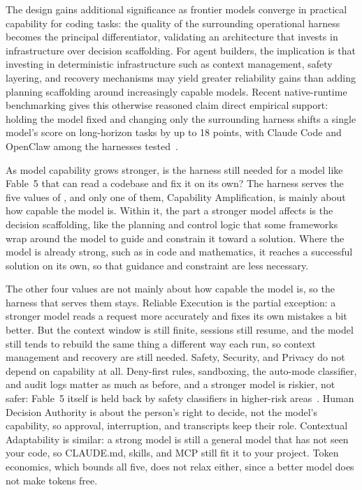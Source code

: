 The design gains additional significance as frontier models converge in practical capability for coding tasks: the quality of the surrounding operational harness becomes the principal differentiator, validating an architecture that invests in infrastructure over decision scaffolding. For agent builders, the implication is that investing in deterministic infrastructure such as context management, safety layering, and recovery mechanisms may yield greater reliability gains than adding planning scaffolding around increasingly capable models. Recent native-runtime benchmarking gives this otherwise reasoned claim direct empirical support: holding the model fixed and changing only the surrounding harness shifts a single model's score on long-horizon tasks by up to 18 points, with Claude Code and OpenClaw among the harnesses tested~\citep{ding2026wildclawbench}.

\tierC{} As model capability grows stronger, is the harness still needed for a model like Fable~5 that can read a codebase and fix it on its own? The harness serves the five values of , and only one of them, Capability Amplification, is mainly about how capable the model is. Within it, the part a stronger model affects is the decision scaffolding, like the planning and control logic that some frameworks wrap around the model to guide and constrain it toward a solution. Where the model is already strong, such as in code and mathematics, it reaches a successful solution on its own, so that guidance and constraint are less necessary.

The other four values are not mainly about how capable the model is, so the harness that serves them stays. Reliable Execution is the partial exception: a stronger model reads a request more accurately and fixes its own mistakes a bit better. But the context window is still finite, sessions still resume, and the model still tends to rebuild the same thing a different way each run, so context management and recovery are still needed. Safety, Security, and Privacy do not depend on capability at all. Deny-first rules, sandboxing, the auto-mode classifier, and audit logs matter as much as before, and a stronger model is riskier, not safer: Fable~5 itself is held back by safety classifiers in higher-risk areas~\citep{anthropic2026fable}. Human Decision Authority is about the person's right to decide, not the model's capability, so approval, interruption, and transcripts keep their role. Contextual Adaptability is similar: a strong model is still a general model that has not seen your code, so CLAUDE.md, skills, and MCP still fit it to your project. Token economics, which bounds all five, does not relax either, since a better model does not make tokens free.

